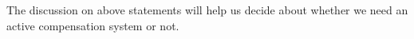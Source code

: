 The discussion on above statements will help us decide about whether we need an active compensation system or not.

 






